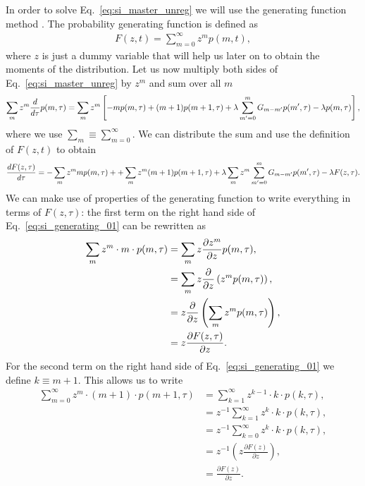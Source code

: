 In order to solve Eq.~\ref{eq:si_master_unreg} we will use the generating
function method . The probability generating function is defined
as
\begin{align}
F(z,t) = \sum_{m=0}^\infty z^m p(m,t),
\end{align}
where $z$ is just a dummy variable that will help us later on to obtain the
moments of the distribution. Let us now multiply both sides of
Eq.~\ref{eq:si_master_unreg} by $z^m$ and sum over all $m$
\begin{equation}
\sum_m z^m {d \over d\tau} p(m, \tau) = 
\sum_m z^m \left[ 
- m p(m, \tau) 
+ (m + 1) p(m + 1, \tau) 
+ \lambda \sum_{m' = 0}^m G_{m-m'} p(m', \tau) - \lambda p(m, \tau)
\right],
\end{equation}
where we use $\sum_m \equiv \sum_{m=0}^\infty$. We can distribute the sum and
use the definition of $F(z, t)$ to obtain
\begin{equation}
{d F(z, \tau) \over d\tau} =
- \sum_m z^m m p(m, \tau) +
+ \sum_m z^m (m + 1) p(m + 1, \tau)
+ \lambda \sum_m z^m \sum_{m'=0}^m G_{m-m'} p(m', \tau)
- \lambda F(z, \tau).
\label{eq:si_generating_01}
\end{equation}
We can make use of properties of the generating function to write everything in
terms of $F(z, \tau)$: the first term on the right hand side of
Eq.~\ref{eq:si_generating_01} can be rewritten as
\begin{align}
\sum_{m} z^{m} \cdot m \cdot p(m, \tau) &=
\sum_{m} z \frac{\partial z^{m}}{\partial z} p(m, \tau), \\
&=\sum_{m} z \frac{\partial}{\partial z}\left(z^{m} p(m, \tau)\right), \\
&=z \frac{\partial}{\partial z}\left(\sum_{m} z^{m} p(m, \tau)\right), \\
&= z {\partial F(z, \tau) \over \partial z}.
\end{align}
For the second term on the right hand side of Eq.~\ref{eq:si_generating_01} we
define $k \equiv m + 1$. This allows us to write
\begin{align}
\sum_{m=0}^{\infty} z^{m} \cdot(m+1) \cdot p(m+1, \tau) &=
\sum_{k=1}^{\infty} z^{k-1} \cdot k \cdot p(k, \tau), \\
&=z^{-1} \sum_{k=1}^{\infty} z^{k} \cdot k \cdot p(k, \tau), \\
&=z^{-1} \sum_{k=0}^{\infty} z^{k} \cdot k \cdot p(k, \tau), \\
&=z^{-1} \left(z \frac{\partial F(z)}{\partial z}\right), \\
&=\frac{\partial F(z)}{\partial z}.
\end{align}

